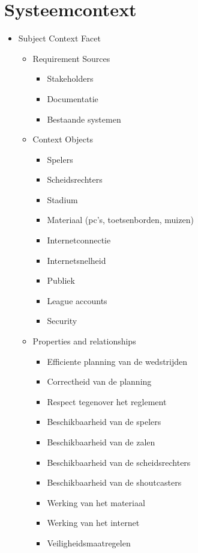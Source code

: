 \documentclass[12pt,a4paper]{article}
\begin{document}
	\section{Systeemcontext}
		\begin{itemize}
			\item Subject Context Facet
			\begin{itemize}
				\item Requirement Sources
				\begin{itemize}
					\item Stakeholders
					\item Documentatie
					\item Bestaande systemen
				\end{itemize}
				\item Context Objects
				\begin{itemize}
					\item Spelers
					\item Scheidsrechters
					\item Stadium
					\item Materiaal (pc's, toetsenborden, muizen)
					\item Internetconnectie
					\item Internetsnelheid
					\item Publiek
					\item League accounts
					\item Security
				\end{itemize}
				\item Properties and relationships
				\begin{itemize}
					\item Efficiente planning van de wedstrijden
					\item Correctheid van de planning
					\item Respect tegenover het reglement
					\item Beschikbaarheid van de spelers
					\item Beschikbaarheid van de zalen
					\item Beschikbaarheid van de scheidsrechters
					\item Beschikbaarheid van de shoutcasters
					\item Werking van het materiaal
					\item Werking van het internet
					\item Veiligheidsmaatregelen
				\end{itemize}
			\end{itemize}

\end{itemize}
\end{document}

